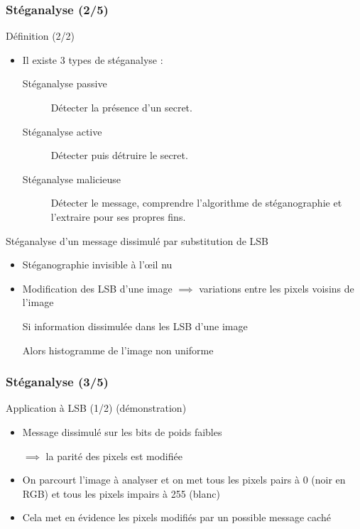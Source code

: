 \documentclass{beamer}
\begin{document}
	\begin{frame}
	\frametitle{Stéganalyse (2/5)}
	\begin{alertblock}{Définition (2/2)}
   	\rightskip=0pt\leftskip=0pt
	\begin{itemize}
	 	\item Il existe 3 types de stéganalyse :
	 		\begin{description}
	 		\item[Stéganalyse passive] Détecter la présence d'un secret.
	 		\item[Stéganalyse active] Détecter puis détruire le secret.
	 		\item[Stéganalyse malicieuse] Détecter le message, comprendre l'algorithme de stéganographie et l'extraire pour ses propres fins.
	 		\end{description}
	\end{itemize}
	\end{alertblock}
	
	\begin{exampleblock}{Stéganalyse d'un message dissimulé par substitution de LSB}
   	\rightskip=0pt\leftskip=0pt
   	\begin{itemize}
   	 	\item Stéganographie invisible à l'\oe il nu
   	 	\item Modification des LSB d'une image $\implies$ variations entre les pixels voisins de l'image
   	 	\item[Si] information dissimulée dans les LSB d'une image
   	 	\item[Alors] histogramme de l'image non uniforme 
   	\end{itemize}
   	\end{exampleblock}
	\end{frame}
	
	\begin{frame}
	\frametitle{Stéganalyse (3/5)}
	\begin{exampleblock}{Application à LSB (1/2) (démonstration)}
   	\rightskip=0pt\leftskip=0pt
	\begin{itemize}
	 	\item Message dissimulé sur les bits de poids faibles	
	 	\item[] $\implies$ la parité des pixels est modifiée
	 	\item On parcourt l'image à analyser et on met tous les pixels pairs à 0 (noir en RGB) et tous les pixels impairs à 255 (blanc)
	 	\item Cela met en évidence les pixels modifiés par un possible message caché
	\end{itemize}
	\end{exampleblock}
	\end{frame}
	
\end{document}
